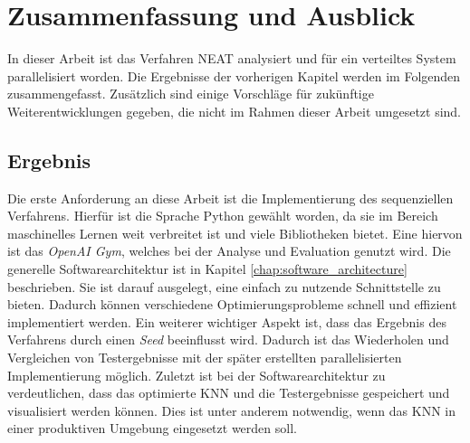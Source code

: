 \chapter{Zusammenfassung und Ausblick}
In dieser Arbeit ist das Verfahren \ac{NEAT} analysiert und für ein verteiltes System parallelisiert worden. Die Ergebnisse der vorherigen Kapitel werden im Folgenden zusammengefasst. Zusätzlich sind einige Vorschläge für zukünftige Weiterentwicklungen gegeben, die nicht im Rahmen dieser Arbeit umgesetzt sind.  

\section{Ergebnis}
Die erste Anforderung an diese Arbeit ist die Implementierung des sequenziellen Verfahrens. Hierfür ist die Sprache Python gewählt worden, da sie im Bereich maschinelles Lernen weit verbreitet ist und viele Bibliotheken bietet. Eine hiervon ist das \emph{OpenAI Gym}, welches bei der Analyse und Evaluation genutzt wird. Die generelle Softwarearchitektur ist in Kapitel \ref{chap:software_architecture} beschrieben. Sie ist darauf ausgelegt, eine einfach zu nutzende Schnittstelle zu bieten. Dadurch können verschiedene Optimierungsprobleme schnell und effizient implementiert werden. Ein weiterer wichtiger Aspekt ist, dass das Ergebnis des Verfahrens durch einen \emph{Seed} beeinflusst wird. Dadurch ist das Wiederholen und Vergleichen von Testergebnisse mit der später erstellten parallelisierten Implementierung möglich. Zuletzt ist bei der Softwarearchitektur zu verdeutlichen, dass das optimierte \ac{KNN} und die Testergebnisse gespeichert und visualisiert werden können. Dies ist unter anderem notwendig, wenn das \ac{KNN} in einer produktiven Umgebung eingesetzt werden soll.
\\\\
